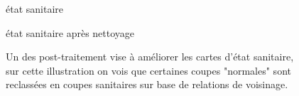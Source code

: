 \documentclass[a4paper, 12pt]{article} %
\begin{document}
\begin{figure}
\begin{minipage}[b]{.49\linewidth}
	\centering état sanitaire
\end{minipage}%
\begin{minipage}[b]{.49\linewidth}
	\centering état sanitaire après nettoyage
\end{minipage}
	\label{fig:clean}
	\caption{Un des post-traitement vise à améliorer les cartes d'état sanitaire, sur cette illustration on vois que certaines coupes "normales" sont reclassées en coupes sanitaires sur base de relations de voisinage.}
\end{figure}
\end{document}
